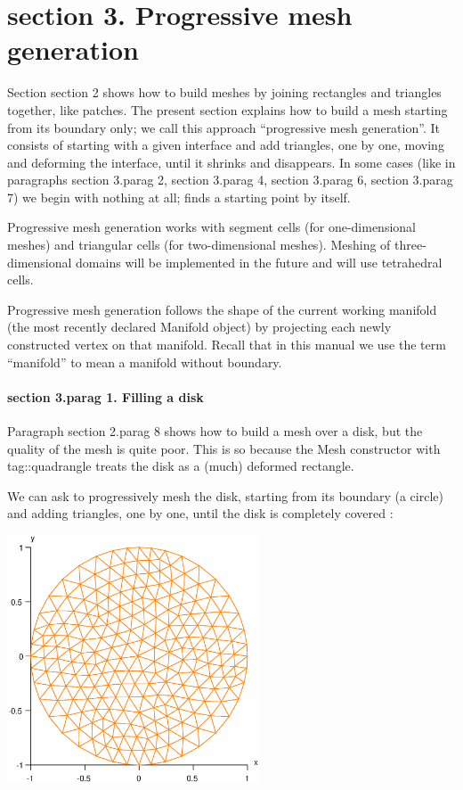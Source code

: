 \section{\numb section 3. Progressive mesh generation}

Section \numb section 2 shows how to build meshes by joining rectangles and triangles together,
like patches.
The present section explains how to build a mesh starting from its boundary only;
we call this approach ``progressive mesh generation''.
It consists of starting with a given interface and add triangles, one by one,
moving and deforming the interface, until it shrinks and disappears.
In some cases (like in paragraphs \numb section 3.\numb parag 2, \numb section 3.\numb parag 4,
\numb section 3.\numb parag 6, \numb section 3.\numb parag 7) we begin with nothing at all;
{\maniFEM} finds a starting point by itself.

Progressive mesh generation works with segment cells (for one-dimensional meshes) and
triangular cells (for two-dimensional meshes).
Meshing of three-dimensional domains will be implemented in the future and will use tetrahedral
cells.

Progressive mesh generation follows the shape of the current working manifold (the most recently
declared {\codett Manifold} object) by {\codett project}ing each newly constructed vertex
on that manifold.
Recall that in this manual we use the term ``manifold'' to mean a manifold without boundary.


\paragraph{\numb section 3.\numb parag 1. Filling a disk}

Paragraph \numb section 2.\numb parag 8 shows how to build a mesh over a disk,
but the quality of the mesh is quite poor.
This is so because the {\codett Mesh} constructor with {\codett tag::quadrangle} treats the
disk as a (much) deformed rectangle.

We can ask {\maniFEM} to progressively mesh the disk, starting from its boundary (a circle)
and adding triangles, one by one, until the disk is completely covered :

\centerline{\includegraphics[width=75mm]{disk-with-tri.eps}}

